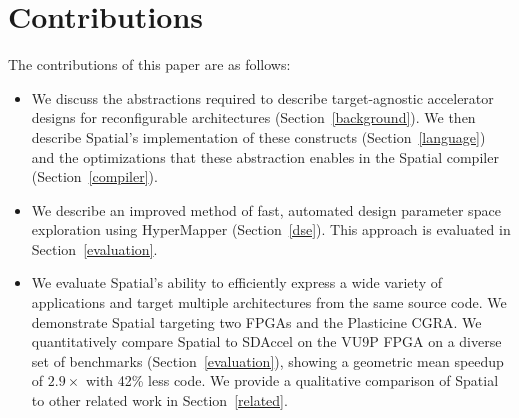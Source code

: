 \section{Contributions}


The contributions of this paper are as follows:
\vspace{-5pt}
\begin{itemize}
  \item We discuss the abstractions required to describe target-agnostic accelerator designs for reconfigurable architectures (Section~\ref{background}). We then describe Spatial's implementation of these constructs (Section~\ref{language}) and the optimizations that these abstraction enables in the Spatial compiler (Section~\ref{compiler}).

  \vspace{5pt}

  \item We describe an improved method of fast, automated design parameter space exploration using HyperMapper (Section~\ref{dse}). This approach is evaluated in Section~\ref{evaluation}.

  \vspace{5pt}

  \item We evaluate Spatial's ability to efficiently express a wide variety of applications and
    target multiple architectures from the same source code. We demonstrate Spatial targeting two FPGAs and the Plasticine CGRA.
    We quantitatively compare Spatial to SDAccel on the VU9P FPGA on a diverse set of benchmarks (Section~\ref{evaluation}), showing a geometric mean speedup of $2.9\times$ with 42\% less code.
    We provide a qualitative comparison of Spatial to other related work in Section~\ref{related}.
\end{itemize}


